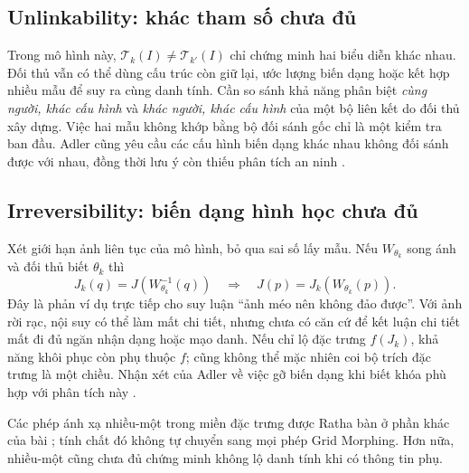 \documentclass[11pt,a4paper]{article}
\newcommand{\Tpl}{\mathcal{T}}
\begin{document}
\subsection{Unlinkability: khác tham số chưa đủ}
Trong mô hình này, $\Tpl_k(I)\ne\Tpl_{k'}(I)$ chỉ chứng minh hai biểu diễn khác nhau. Đối thủ vẫn có thể dùng cấu trúc còn giữ lại, ước lượng biến dạng hoặc kết hợp nhiều mẫu để suy ra cùng danh tính. Cần so sánh khả năng phân biệt \emph{cùng người, khác cấu hình} và \emph{khác người, khác cấu hình} của một bộ liên kết do đối thủ xây dựng. Việc hai mẫu không khớp bằng bộ đối sánh gốc chỉ là một kiểm tra ban đầu. Adler cũng yêu cầu các cấu hình biến dạng khác nhau không đối sánh được với nhau, đồng thời lưu ý còn thiếu phân tích an ninh \cite[tr.~393--395]{adler}.

\subsection{Irreversibility: biến dạng hình học chưa đủ}
Xét giới hạn ảnh liên tục của mô hình, bỏ qua sai số lấy mẫu. Nếu $W_{\theta_k}$ song ánh và đối thủ biết $\theta_k$ thì
\begin{equation}\label{eq:recover}
 J_k(q)=J(W_{\theta_k}^{-1}(q))
 \quad\Longrightarrow\quad
 J(p)=J_k(W_{\theta_k}(p)).
\end{equation}
Đây là phản ví dụ trực tiếp cho suy luận ``ảnh méo nên không đảo được''. Với ảnh rời rạc, nội suy có thể làm mất chi tiết, nhưng chưa có căn cứ để kết luận chi tiết mất đi đủ ngăn nhận dạng hoặc mạo danh. Nếu chỉ lộ đặc trưng $f(J_k)$, khả năng khôi phục còn phụ thuộc $f$; cũng không thể mặc nhiên coi bộ trích đặc trưng là một chiều. Nhận xét của Adler về việc gỡ biến dạng khi biết khóa phù hợp với phân tích này \cite[tr.~395]{adler}.

Các phép ánh xạ nhiều-một trong miền đặc trưng được Ratha bàn ở phần khác của bài \cite[tr.~630--631]{ratha}; tính chất đó không tự chuyển sang mọi phép Grid Morphing. Hơn nữa, nhiều-một cũng chưa đủ chứng minh không lộ danh tính khi có thông tin phụ.
\end{document}
